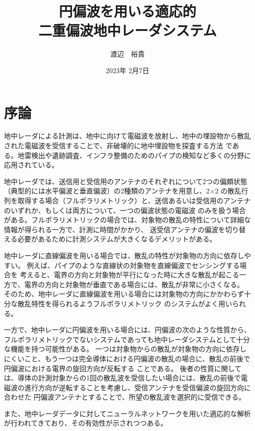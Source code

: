 \documentclass[11pt,a4paper,uplatex]{ujarticle}
\title{円偏波を用いる適応的\\二重偏波地中レーダシステム}
\date{2023年 2月7日}
\author{渡辺　裕貴}
\begin{document}
\maketitle
\newpage
\tableofcontents
\newpage
\section{序論}

  地中レーダによる計測は、地中に向けて電磁波を放射し、地中の埋設物から散乱された電磁波を受信することで、非破壊的に地中埋設物を探査する方法
  である。地雷検出や遺跡調査、インフラ整備のためのパイプの検知など多くの分野に応用されている\cite{landmine_example}\cite{remains_example}。

  地中レーダでは、送信用と受信用のアンテナのそれぞれについて2つの偏頗状態（典型的には水平偏波と垂直偏波）の2種類のアンテナを用意し、2$\times$2
  の散乱行列を取得する場合（フルポラリメトリック）と、送信あるいは受信用のアンテナのいずれか、もしくは両方について、一つの偏波状態の電磁波
  のみを扱う場合がある。フルポラリメトリックの場合では、対象物の散乱の特性について詳細な情報が得られる一方で、計測に時間がかかり、
  送受信アンテナの偏波を切り替える必要があるために計測システムが大きくなるデメリットがある。

  地中レーダに直線偏波を用いる場合では、散乱の特性が対象物の方向に依存しやすい。
  例えば、パイプのような直線状の対象物を直線偏波でセンシングする場合を
  考えると、電界の方向と対象物が平行になった時に大きな散乱が起こる一方で、電界の方向と対象物が垂直である場合には、散乱が非常に小さくなる。
  そのため、地中レーダに直線偏波を用いる場合には対象物の方向にかかわらず十分な散乱特性を得られるようフルポラリメトリック
  のシステムがよく用いられる。
  
  一方で、地中レーダに円偏波を用いる場合には、円偏波の次のような性質から、フルポラリメトリックでないシステムであっても地中レーダシステムとして十分な機能を持つ可能性がある。
  一つは対象物からの散乱が対象物の方向に依存しにくいこと、もう一つは完全導体における円偏波の散乱の場合に、散乱の前後で円偏波における電界の旋回方向が反転する
  ことである。
  後者の性質に関しては、導体の計測対象からの1回の散乱波を受信したい場合には、散乱の前後で電磁波の進行方向が逆転することを考慮し、受信アンテナを受信偏波の旋回方向に合わせた
  円偏波アンテナとすることで、所望の散乱波を選択的に受信できる。

  また、地中レーダデータに対してニューラルネットワークを用いた適応的な解析が行われてきており、その有効性が示されつつある\cite{landmine_CNN}\cite{hidden_Markov}。
\end{document}
